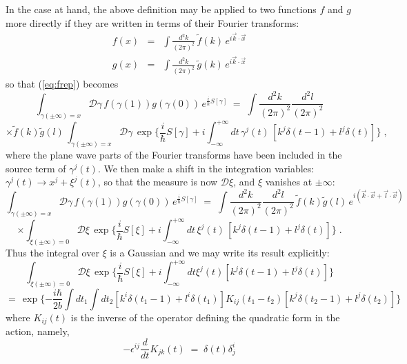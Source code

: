 \documentclass[a4paper,12pt]{article}
\begin{document}
In the case at hand, the above definition may be applied to two
functions $f$ and $g$ more directly if they are written in terms of
their Fourier transforms:
\begin{eqnarray}
f(x)&=& \int \frac{d^2k}{(2\pi)^2}\, {\tilde f}(k) \, 
e^{i {\vec k} \cdot {\vec x}}\nonumber\\ 
g(x)&=& \int \frac{d^2k}{(2\pi)^2}\, {\tilde g}(k) \, 
e^{i {\vec k} \cdot {\vec x}} 
\end{eqnarray}
so that (\ref{eq:frep}) becomes
$$
\int_{\gamma(\pm \infty)=x} {\mathcal D}\gamma \, f(\gamma(1))
g(\gamma(0)) \,
e^{\frac{i}{\hbar}S[\gamma]} \;=\; \int \frac{d^2k}{(2\pi)^2}
\frac{d^2l}{(2\pi)^2}
$$
\begin{equation}
  \label{eq:frep2}
\times {\tilde f}(k) {\tilde g}(l) \, \int_{\gamma(\pm \infty)=x}
{\mathcal D}\gamma \, 
\exp\{\frac{i}{\hbar} S[\gamma] + i \int_{-\infty}^{+\infty} dt
\,\gamma^j(t)\,[k^j \delta(t-1) +l^j \delta(t)]\}\;,
\end{equation}
where the plane wave parts of the Fourier transforms have been
included in the source term of ${\gamma}^j(t)$.  We then make a
shift in
the integration variables: $\gamma^j(t) \to x^j + \xi^j(t)$, so
that the
measure is now ${\mathcal D}\xi$, and $\xi$ vanishes at
$\pm\infty$:
$$
\int_{\gamma(\pm \infty)=x} {\mathcal D}\gamma \, f(\gamma(1))
g(\gamma(0)) \,
e^{\frac{i}{\hbar}S[\gamma]} \;=\; \int \frac{d^2k}{(2\pi)^2}
\frac{d^2l}{(2\pi)^2} \,
{\tilde f}(k) {\tilde g}(l) \, e^{i ({\vec k}\cdot {\vec x} + {\vec
l}\cdot
  {\vec x})}
$$
\begin{equation}
  \label{eq:frep3}
\times \int_{\xi (\pm \infty)=0} {\mathcal D}\xi \,
\exp\{\frac{i}{\hbar} S[\xi] + i \int_{-\infty}^{+\infty} dt
\,\xi^j(t) \,
[k^j \delta(t-1) + l^j \delta(t)]\} \;.
\end{equation}
Thus the integral over $\xi$ is a Gaussian and we may write its
result
explicitly:
$$
\int_{\xi (\pm \infty)=0} {\mathcal D}\xi \, \exp\{\frac{i}{\hbar}
S[\xi] + i
\int_{-\infty}^{+\infty} dt \xi^j(t) [k^j \delta(t-1) +l^j
\delta(t)]\}
$$
\begin{equation}
  \label{eq:frep4}
=\,\exp\{-\frac{i \hbar}{2 b} \int dt_1 \int dt_2 [k^i
\delta(t_1-1)
+l^i \delta(t_1)]K_{ij}(t_1-t_2) [k^j \delta(t_2-1) +l^j
\delta(t_2)]\}
\end{equation}
where $K_{ij}(t)$ is the inverse of the operator defining the
quadratic form in the action, namely,
\begin{equation}
  \label{eq:frep5}
- \epsilon^{ij} \frac{d}{dt} K_{jk}(t) \;=\; \delta (t) \delta^i_j 
\end{equation}
\end{document}
